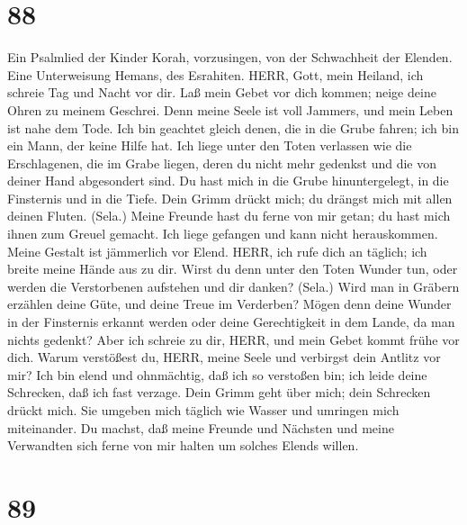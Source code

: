 \hypertarget{section-87}{%
\section{88}\label{section-87}}

 Ein Psalmlied der Kinder Korah, vorzusingen, von der
Schwachheit der Elenden. Eine Unterweisung Hemans, des Esrahiten. HERR,
Gott, mein Heiland, ich schreie Tag und Nacht vor dir.  Laß
mein Gebet vor dich kommen; neige deine Ohren zu meinem Geschrei.
 Denn meine Seele ist voll Jammers, und mein Leben ist nahe
dem Tode.  Ich bin geachtet gleich denen, die in die Grube
fahren; ich bin ein Mann, der keine Hilfe hat.  Ich liege
unter den Toten verlassen wie die Erschlagenen, die im Grabe liegen,
deren du nicht mehr gedenkst und die von deiner Hand abgesondert sind.
 Du hast mich in die Grube hinuntergelegt, in die Finsternis
und in die Tiefe.  Dein Grimm drückt mich; du drängst mich
mit allen deinen Fluten. (Sela.)  Meine Freunde hast du
ferne von mir getan; du hast mich ihnen zum Greuel gemacht. Ich liege
gefangen und kann nicht herauskommen.  Meine Gestalt ist
jämmerlich vor Elend. HERR, ich rufe dich an täglich; ich breite meine
Hände aus zu dir.  Wirst du denn unter den Toten Wunder
tun, oder werden die Verstorbenen aufstehen und dir danken? (Sela.)
 Wird man in Gräbern erzählen deine Güte, und deine Treue
im Verderben?  Mögen denn deine Wunder in der Finsternis
erkannt werden oder deine Gerechtigkeit in dem Lande, da man nichts
gedenkt?  Aber ich schreie zu dir, HERR, und mein Gebet
kommt frühe vor dich.  Warum verstößest du, HERR, meine
Seele und verbirgst dein Antlitz vor mir?  Ich bin elend
und ohnmächtig, daß ich so verstoßen bin; ich leide deine Schrecken, daß
ich fast verzage.  Dein Grimm geht über mich; dein
Schrecken drückt mich.  Sie umgeben mich täglich wie Wasser
und umringen mich miteinander.  Du machst, daß meine
Freunde und Nächsten und meine Verwandten sich ferne von mir halten um
solches Elends willen.

\hypertarget{section-88}{%
\section{89}\label{section-88}}

